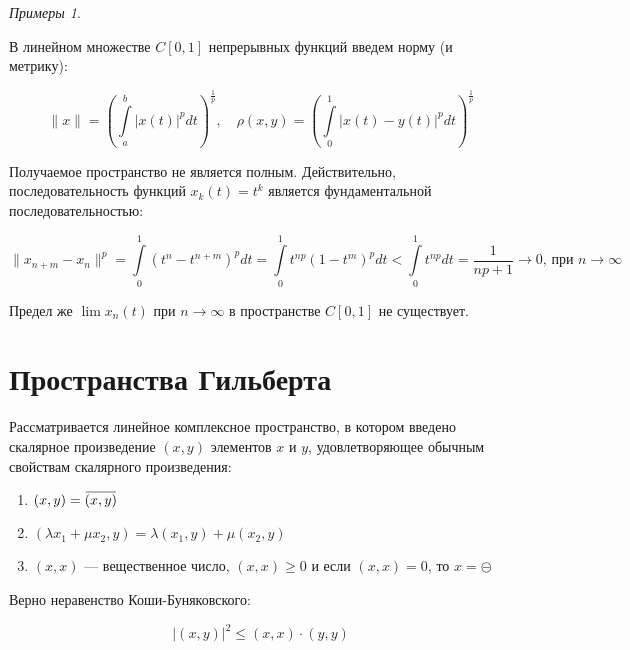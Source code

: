 \documentclass[12pt,a4paper,titlepage, oneside]{book}
\newcommand{\overbar}[1]{\mkern 1.5mu\overline{\mkern-1.5mu#1\mkern-1.5mu}\mkern 1.5mu}
\theoremstyle{definition}
\theoremstyle{plain}
\theoremstyle{remark}
\theoremstyle{remark}
\theoremstyle{remark}
\newtheorem*{examples}{Примеры}
\theoremstyle{remark}
\theoremstyle{plain}
\theoremstyle{plain}
\begin{document}
\begin{examples}
\begin{enumerate}
	В линейном множестве $C[0,1]$ непрерывных функций введем норму (и метрику):

	\begin{equation*}
	\lVert x\rVert = (\int\limits_a^b\lvert x(t)\rvert^pdt)^{\frac{1}{p}},\quad\rho(x,y) = (\int\limits_0^1\lvert x(t)-y(t)\rvert^pdt)^{\frac{1}{p}}
	\end{equation*}

	Получаемое пространство не является полным. Действительно, последовательность функций $x_k(t)=t^k$ является фундаментальной последовательностью:

	\begin{equation*}
	\lVert x_{n+m}-x_n\rVert^p=\int\limits_0^1(t^n-t^{n+m})^pdt=\int\limits_0^1t^{np}(1-t^m)^pdt<\int\limits_0^1t^{np}dt=\frac{1}{np+1}\to0 \mbox{, при } n \to\infty
	\end{equation*}

	Предел же $\lim x_n(t)$ при $n\to\infty$ в пространстве $C[0,1]$ не существует.

\end{enumerate}

\end{examples}

\section{Пространства Гильберта}

Рассматривается линейное комплексное пространство, в котором введено скалярное произведение $(x, y)$ элементов $x$ и $y$, удовлетворяющее обычным свойствам скалярного произведения:

\begin{enumerate}

    \item $(x, y) = \overbar{(x, y)}$

    \item $(\lambda x_1 + \mu x_2, y) = \lambda (x_1, y) + \mu (x_2, y)$

    \item $(x, x)$ --- вещественное число, $(x, x) \geqslant 0$ и если $(x, x) = 0$, то $x = \circleddash$

\end{enumerate}

Верно неравенство Коши-Буняковского:

\begin{equation*}
\lvert (x, y) \rvert ^2 \le (x, x) \cdot (y, y)
\end{equation*}
\end{document}
